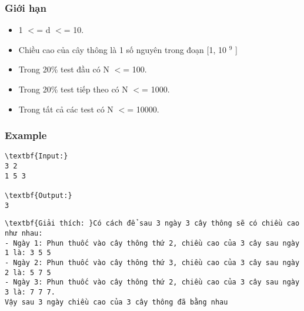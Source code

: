 \subsubsection{Giới hạn}
\begin{itemize}
	\item 1 $<$= d $<$= 10.
	\item Chiều cao của cây thông là 1 số nguyên trong đoạn [1, 10 $^ 9 $ ]
	\item Trong 20\% test đầu có N $<$= 100.
	\item Trong 20\% test tiếp theo có N $<$= 1000.
	\item Trong tất cả các test có N $<$= 10000.
\end{itemize}

\subsubsection{Example}
\begin{verbatim}
\textbf{Input:}
3 2
1 5 3

\textbf{Output:}
3\end{verbatim}
\begin{verbatim}
\textbf{Giải thích: }Có cách để sau 3 ngày 3 cây thông sẽ có chiều cao như nhau:
- Ngày 1: Phun thuốc vào cây thông thứ 2, chiều cao của 3 cây sau ngày 1 là: 3 5 5
- Ngày 2: Phun thuốc vào cây thông thứ 3, chiều cao của 3 cây sau ngày 2 là: 5 7 5
- Ngày 3: Phun thuốc vào cây thông thứ 2, chiều cao của 3 cây sau ngày 3 là: 7 7 7.
Vậy sau 3 ngày chiều cao của 3 cây thông đã bằng nhau\end{verbatim}
